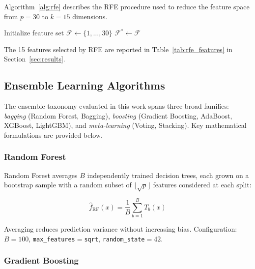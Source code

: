 \documentclass[10pt,letterpaper]{article}
\begin{document}
Algorithm~\ref{alg:rfe} describes the RFE procedure used to reduce the feature space from $p=30$
to $k=15$ dimensions.

\begin{algorithm}[h]
\caption{Recursive Feature Elimination (RFE)}
\label{alg:rfe}
Initialize feature set $\mathcal{F} \leftarrow \{1, \ldots, 30\}$\;
$\mathcal{F}^* \leftarrow \mathcal{F}$\;
\end{algorithm}

The 15 features selected by RFE are reported in Table~\ref{tab:rfe_features} in
Section~\ref{sec:results}.

\subsection{Ensemble Learning Algorithms}

The ensemble taxonomy evaluated in this work spans three broad families: \emph{bagging}
(Random Forest, Bagging), \emph{boosting} (Gradient Boosting, AdaBoost, XGBoost, LightGBM), and
\emph{meta-learning} (Voting, Stacking). Key mathematical formulations are provided below.

\subsubsection{Random Forest~\cite{breiman2001}}

Random Forest averages $B$ independently trained decision trees, each grown on a bootstrap sample
with a random subset of $\lfloor\sqrt{p}\rfloor$ features considered at each split:

\begin{equation}
    \hat{f}_{\text{RF}}(x) = \frac{1}{B} \sum_{b=1}^{B} T_b(x)
    \label{eq:rf}
\end{equation}

Averaging reduces prediction variance without increasing bias. Configuration: $B=100$,
\texttt{max\_features}$=$\texttt{sqrt}, \texttt{random\_state}$=42$.

\subsubsection{Gradient Boosting~\cite{friedman2001}}
\end{document}
